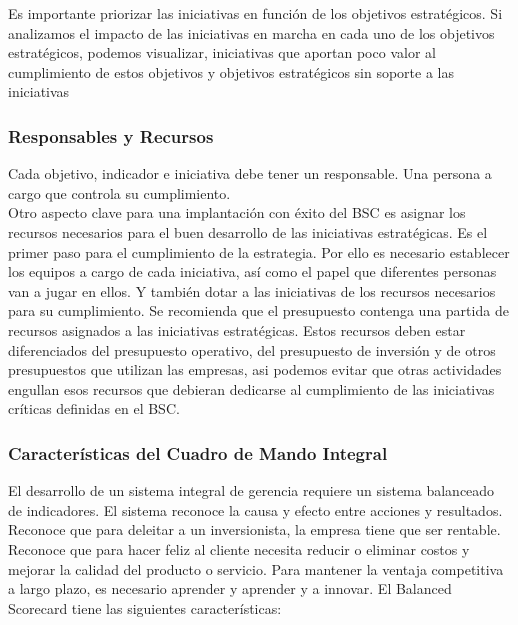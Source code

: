 \documentclass[preprint,12pt]{elsarticle}
\begin{document}
Es importante priorizar las iniciativas en función de los objetivos estratégicos. Si analizamos el impacto de las iniciativas en marcha en cada uno de los objetivos estratégicos, podemos visualizar, iniciativas que aportan poco valor al cumplimiento de estos objetivos y objetivos estratégicos sin soporte a las iniciativas\cite{referenciarobles3} 

\subsubsection{\textbf{Responsables y Recursos}}

Cada objetivo, indicador e iniciativa debe tener un responsable. Una persona a cargo que controla su cumplimiento.
\\
Otro aspecto clave para una implantación con éxito del BSC es asignar los recursos necesarios para el buen desarrollo de las iniciativas estratégicas. Es el primer paso para el cumplimiento de la estrategia. Por ello es necesario establecer los equipos a cargo de cada iniciativa, así como el papel que diferentes personas van a jugar en ellos. Y también dotar a las iniciativas de los recursos necesarios para su cumplimiento. Se recomienda que el presupuesto contenga una partida de recursos asignados a las iniciativas estratégicas. Estos recursos deben estar diferenciados del presupuesto operativo, del presupuesto de inversión y de otros presupuestos que utilizan las empresas, asi podemos evitar que otras actividades engullan esos recursos que debieran dedicarse al cumplimiento de las iniciativas críticas definidas en el BSC.\cite{referenciarobles2} 

\subsubsection{\textbf{Características del Cuadro de Mando Integral}}

El desarrollo de un sistema integral de gerencia requiere un sistema balanceado de indicadores. El sistema reconoce la causa y efecto entre acciones y resultados. Reconoce que para deleitar a un inversionista, la empresa tiene que ser rentable. Reconoce que para hacer feliz al cliente necesita reducir o eliminar costos y mejorar la calidad del producto o servicio. Para mantener la ventaja competitiva a largo plazo, es necesario aprender y aprender y a innovar. El Balanced Scorecard tiene las siguientes características:
\end{document}
